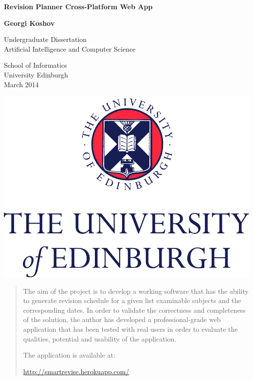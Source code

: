 \documentclass[bsc,frontabs,twoside,singlespacing,parskip]{infthesis}     %
\begin{document}
\begin{titlepage}
    \begin{center}
        \vspace*{1cm}

        \huge
        \textbf{Revision Planner Cross-Platform Web App}

        \vspace{1.5cm}

        \LARGE
        \textbf{Georgi Koshov}

        \vfill

        \Large
        Undergraduate Dissertation\\
        Artificial Intelligence and Computer Science

        \vspace{0.8cm}

        \large
        School of Informatics\\
        University Edinburgh\\
        March 2014

        \vspace{0.8cm}

        \includegraphics{university}

    \end{center}
\end{titlepage}



\begin{abstract}
	The aim of the project is to develop a working software that has the ability to generate revision schedule for a given list examinable subjects and the corresponding dates. In order to validate the correctness and completeness of the solution, the author has developed a professional-grade web application that has been tested with real users in order to evaluate the qualities, potential and usability of the application.\\

	\centerline{The application is available at:}
	\centerline{\hyperref[http://smartrevise.herokuapp.com/]{http://smartrevise.herokuapp.com/}}
\end{abstract}
\end{document}
